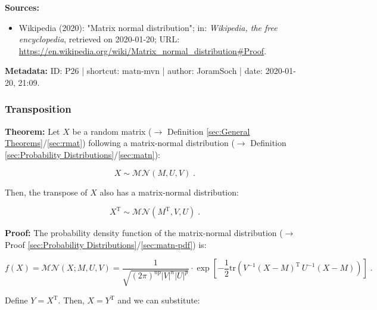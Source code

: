 \documentclass[a4paper,12pt,twoside]{book}
\begin{document}
\vspace{1em}
\textbf{Sources:}
\begin{itemize}
\item Wikipedia (2020): "Matrix normal distribution"; in: \textit{Wikipedia, the free encyclopedia}, retrieved on 2020-01-20; URL: \url{https://en.wikipedia.org/wiki/Matrix_normal_distribution#Proof}.
\end{itemize}


\vspace{1em}
\textbf{Metadata:} ID: P26 | shortcut: matn-mvn | author: JoramSoch | date: 2020-01-20, 21:09.
\vspace{1em}



\subsubsection[\textbf{Transposition}]{Transposition} \label{sec:matn-trans}
\setcounter{equation}{0}

\textbf{Theorem:} Let $X$ be a random matrix ($\rightarrow$ Definition \ref{sec:General Theorems}/\ref{sec:rmat}) following a matrix-normal distribution ($\rightarrow$ Definition \ref{sec:Probability Distributions}/\ref{sec:matn}):

\begin{equation} \label{eq:matn-trans-matn}
X \sim \mathcal{MN}(M, U, V) \; .
\end{equation}

Then, the transpose of $X$ also has a matrix-normal distribution:

\begin{equation} \label{eq:matn-trans-matn-trans}
X^\mathrm{T} \sim \mathcal{MN}(M^\mathrm{T}, V, U) \; .
\end{equation}


\vspace{1em}
\textbf{Proof:} The probability density function of the matrix-normal distribution ($\rightarrow$ Proof \ref{sec:Probability Distributions}/\ref{sec:matn-pdf}) is:

\begin{equation} \label{eq:matn-trans-matn-pdf-X}
f(X) = \mathcal{MN}(X; M, U, V) = \frac{1}{\sqrt{(2\pi)^{np} |V|^n |U|^p}} \cdot \exp\left[-\frac{1}{2} \mathrm{tr}\left( V^{-1} (X-M)^\mathrm{T} \, U^{-1} (X-M) \right) \right] \; .
\end{equation}

Define $Y = X^\mathrm{T}$. Then, $X = Y^\mathrm{T}$ and we can substitute:
\end{document}
